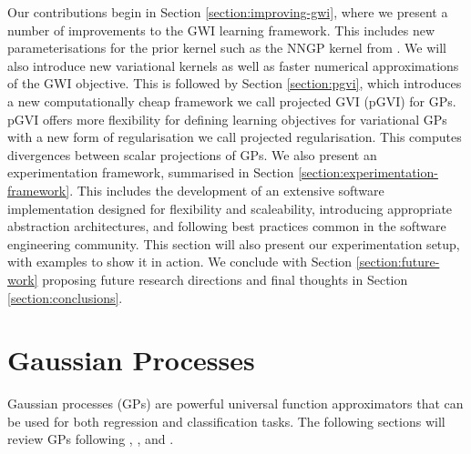 \documentclass{article}
\numberwithin{equation}{section}
\begin{document}
Our contributions begin in Section \ref{section:improving-gwi}, where we present a number of improvements to the GWI learning framework.
This includes new parameterisations for the prior kernel such as the NNGP kernel from \cite{novak2019neural}.
We will also introduce new variational kernels as well as faster numerical approximations of the GWI objective.
This is followed by Section \ref{section:pgvi}, which introduces a new computationally cheap framework we call projected GVI 
(pGVI) for GPs.
pGVI offers more flexibility for defining learning objectives for variational GPs with a new form of regularisation we call projected regularisation.
This computes divergences between scalar projections of GPs.
We also present an experimentation framework, summarised in Section \ref{section:experimentation-framework}. 
This includes the development of an extensive software implementation designed for flexibility and scaleability, introducing appropriate abstraction architectures, and following best practices common in the software engineering community. 
This section will also present our experimentation setup, with examples to show it in action. We conclude with Section \ref{section:future-work} proposing future research directions and final thoughts in Section \ref{section:conclusions}.

\newpage
\section{Gaussian Processes}\label{section:gaussian-processes}
Gaussian processes (GPs) are powerful universal function approximators that can be used for both regression and classification tasks. The following sections will review GPs following \cite{rasmussen2003gaussian}, \cite{matthews2017scalable}, and \cite{wild2022generalized}.
\end{document}
